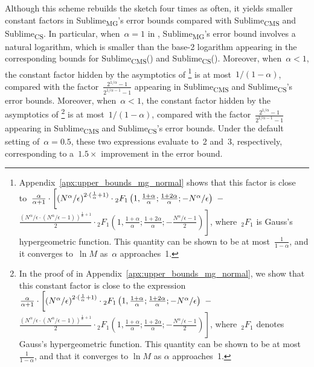 \documentclass[sigconf]{acmart}
\newcommand{\sketch}{Sublime}
\newcommand{\sketchcms}{\sketch\textsubscript{CMS}\xspace}
\newcommand{\sketchcs}{\sketch\textsubscript{CS}\xspace}
\newcommand{\sketchmg}{\sketch\textsubscript{MG}\xspace}
\begin{document}
Although this scheme rebuilds the sketch four times as often, it yields smaller constant factors in \sketchmg's error bounds compared with \sketchcms and \sketchcs.
In particular, when~$\alpha=1$ in , \sketchmg's error bound involves a natural logarithm, which is smaller than the base-2 logarithm appearing in the corresponding bounds for \sketchcms () and \sketchcs ().
\iftods
Moreover, when~$\alpha<1$, the constant factor hidden by the asymptotics of \footnote{
    Appendix~\ref{apx:upper_bounds_mg_normal} shows that this factor is close to~$\frac{\alpha}{\alpha+1} \cdot \left[ \left( N^\alpha/\epsilon \right)^{2 \cdot (\frac1\alpha+1)} \cdot {}_2F_1\left( 1, \frac{1+\alpha}{\alpha}; \frac{1+2\alpha}{\alpha}; -N^\alpha/\epsilon \right) \vphantom{\frac{(N^\alpha/\epsilon \cdot (N^\alpha/\epsilon-1))^{\frac1\alpha+1}}2} \right. -{}$ $\left. \frac{(N^\alpha/\epsilon \cdot (N^\alpha/\epsilon-1))^{\frac1\alpha+1}}2 \cdot {}_2F_1\left( 1, \frac{1+\alpha}\alpha; \frac{1+2\alpha}\alpha; -\frac{N^\alpha/\epsilon-1}{2} \right) \right]$, where~${}_2F_1$ is Gauss's hypergeometric function.
    This quantity can be shown to be at most~$\frac{1}{1-\alpha}$, and it converges to~$\ln M$ as~$\alpha$ approaches~1.
} is at most~$1/(1-\alpha)$, compared with the factor~$\frac{2^{1/\alpha}-1}{2^{1/\alpha-1}-1}$ appearing in \sketchcms and \sketchcs's error bounds.
\else
Moreover, when~$\alpha<1$, the constant factor hidden by the asymptotics of \footnote{
    In the proof of  in Appendix~\ref{apx:upper_bounds_mg_normal}, we show that this constant factor is close to the expression~$\frac{\alpha}{\alpha+1} \cdot \left[ \left( N^\alpha/\epsilon \right)^{2 \cdot (\frac1\alpha+1)} \cdot {}_2F_1\left( 1, \frac{1+\alpha}{\alpha}; \frac{1+2\alpha}{\alpha}; -N^\alpha/\epsilon \right) \vphantom{\frac{(N^\alpha/\epsilon \cdot (N^\alpha/\epsilon-1))^{\frac1\alpha+1}}2} \right. -{}$ $\left. \frac{(N^\alpha/\epsilon \cdot (N^\alpha/\epsilon-1))^{\frac1\alpha+1}}2 \cdot {}_2F_1\left( 1, \frac{1+\alpha}\alpha; \frac{1+2\alpha}\alpha; -\frac{N^\alpha/\epsilon-1}{2} \right) \right]$, where~${}_2F_1$ denotes Gauss's hypergeometric function.
    This quantity can be shown to be at most~$\frac{1}{1-\alpha}$, and that it converges to $\ln M$ as $\alpha$ approaches~1.
} is at most~$1/(1-\alpha)$, compared with the factor~$\frac{2^{1/\alpha}-1}{2^{1/\alpha-1}-1}$ appearing in \sketchcms and \sketchcs's error bounds.
\fi
Under the default setting of~$\alpha=0.5$, these two expressions evaluate to~2 and~3, respectively, corresponding to a~$1.5\times$ improvement in the error bound.
\end{document}
